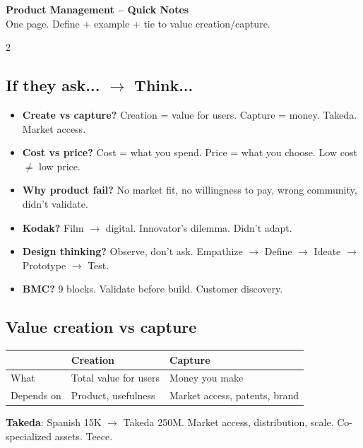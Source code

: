 \documentclass[10pt,landscape,a4paper]{article}
\begin{document}
\normalsize

\begin{center}
{\LARGE\bfseries\color{accent} Product Management -- Quick Notes}\\[0.3em]
\small One page. Define + example + tie to value creation/capture.
\end{center}
\vspace{0.5em}

\begin{multicols}{2}

\subsection*{\color{accent} If they ask... $\to$ Think...}
\begin{itemize}[leftmargin=*,nosep]
\item \textbf{Create vs capture?} Creation = value for users. Capture = money. Takeda. Market access.
\item \textbf{Cost vs price?} Cost = what you spend. Price = what you choose. Low cost $\neq$ low price.
\item \textbf{Why product fail?} No market fit, no willingness to pay, wrong community, didn't validate.
\item \textbf{Kodak?} Film $\to$ digital. Innovator's dilemma. Didn't adapt.
\item \textbf{Design thinking?} Observe, don't ask. Empathize $\to$ Define $\to$ Ideate $\to$ Prototype $\to$ Test.
\item \textbf{BMC?} 9 blocks. Validate before build. Customer discovery.
\end{itemize}

\subsection*{\color{accent} Value creation vs capture}
\begin{center}
\small
\begin{tabular}{@{}lll@{}}
\toprule
\textbf{} & \textbf{Creation} & \textbf{Capture} \\
\midrule
What & Total value for users & Money you make \\
Depends on & Product, usefulness & Market access, patents, brand \\
\bottomrule
\end{tabular}
\end{center}
\textbf{Takeda}: Spanish 15K $\to$ Takeda 250M. Market access, distribution, scale. Co-specialized assets. Teece.


\end{multicols}
\end{document}
